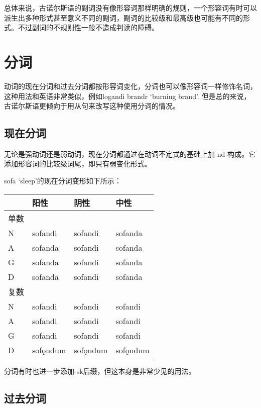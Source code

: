 总体来说，古诺尔斯语的副词没有像形容词那样明确的规则，一个形容词有时可以派生出多种形式甚至意义不同的副词，副词的比较级和最高级也可能有不同的形式。不过副词的不规则性一般不造成判读的障碍。

\section{分词}\label{分词}

动词的现在分词和过去分词都按形容词变化，分词也可以像形容词一样修饰名词，这种用法和英语非常类似，例如logandi
brandr `burning brand‌'.
但是总的来说，古诺尔斯语更倾向于用从句来改写这种使用分词的情况。

\subsection{现在分词}\label{现在分词}

无论是强动词还是弱动词，现在分词都通过在动词不定式的基础上加-nd-构成。它添加形容词的比较级词尾，即只有弱变化形式。

sofa `sleep‌'的现在分词变形如下所示：

\begin{longtable}{llll}
  \toprule
       & 阳性     & 阴性     & 中性     \\
  \midrule
  \endhead
  \bottomrule
  \endfoot
  单数 &          &          &          \\
  N    & sofandi  & sofandi  & sofanda  \\
  A    & sofanda  & sofandi  & sofanda  \\
  G    & sofanda  & sofandi  & sofanda  \\
  D    & sofanda  & sofandi  & sofanda  \\
  复数 &          &          &          \\
  N    & sofandi  & sofandi  & sofandi  \\
  A    & sofandi  & sofandi  & sofandi  \\
  G    & sofandi  & sofandi  & sofandi  \\
  D    & sofǫndum & sofǫndum & sofǫndum \\
\end{longtable}

分词有时也进一步添加-sk后缀，但这本身是非常少见的用法。

\subsection{过去分词}\label{过去分词}

